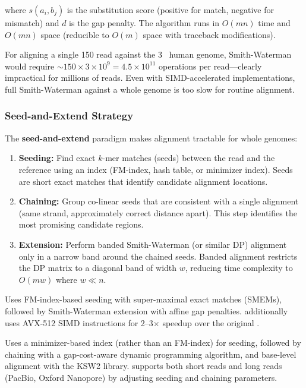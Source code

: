 where $s(a_i, b_j)$ is the substitution score (positive for match, negative for mismatch) and $d$ is the gap penalty. The algorithm runs in $O(mn)$ time and $O(mn)$ space (reducible to $O(m)$ space with traceback modifications).

For aligning a single 150\basepair{} read against the 3~\gigabase{} human genome, Smith-Waterman would require $\sim 150 \times 3 \times 10^9 = 4.5 \times 10^{11}$ operations per read---clearly impractical for millions of reads. Even with SIMD-accelerated implementations, full Smith-Waterman against a whole genome is too slow for routine alignment.

\subsubsection{Seed-and-Extend Strategy}

The \textbf{seed-and-extend} paradigm makes alignment tractable for whole genomes:

\begin{enumerate}[itemsep=2pt]
  \item \textbf{Seeding:} Find exact $k$-mer matches (seeds) between the read and the reference using an index (FM-index, hash table, or minimizer index). Seeds are short exact matches that identify candidate alignment locations.
  \item \textbf{Chaining:} Group co-linear seeds that are consistent with a single alignment (same strand, approximately correct distance apart). This step identifies the most promising candidate regions.
  \item \textbf{Extension:} Perform banded Smith-Waterman (or similar DP) alignment only in a narrow band around the chained seeds. Banded alignment restricts the DP matrix to a diagonal band of width $w$, reducing time complexity to $O(mw)$ where $w \ll n$.
\end{enumerate}

\begin{description}[style=nextline, font=\bfseries, itemsep=3pt]
  \item[BWA-MEM2]
  Uses FM-index-based seeding with super-maximal exact matches (SMEMs), followed by Smith-Waterman extension with affine gap penalties.  additionally uses AVX-512 SIMD instructions for 2--3$\times$ speedup over the original .

  \item[minimap2]
  Uses a minimizer-based index (rather than an FM-index) for seeding, followed by chaining with a gap-cost-aware dynamic programming algorithm, and base-level alignment with the KSW2 library.  supports both short reads and long reads (PacBio, Oxford Nanopore) by adjusting seeding and chaining parameters.
\end{description}

